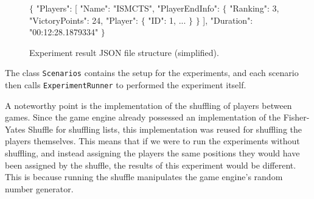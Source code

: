 \begin{figure}[ht]
\begin{code}[commandchars=\\\{\},codes={\catcode`\$=3\catcode`\^=7\catcode`\_=8}]
$\{$
    "Players": [
        "Name": "ISMCTS",
        "PlayerEndInfo": $\{$
            "Ranking": 3,
            "VictoryPoints": 24,
            "Player": $\{$
                "ID": 1,
                ...
            $\}$
        $\}$
    ],
    "Duration": "00:12:28.1879334"
$\}$
\end{code}
\caption{Experiment result JSON file structure (simplified).}\label{dd:experimentjson}
\end{figure}

The class \texttt{Scenarios} contains the setup for the experiments,
and each scenario then calls \texttt{ExperimentRunner} to performed
the experiment itself.

A noteworthy point is the implementation of the shuffling of players between games.
Since the game engine already possessed an implementation of the Fisher-Yates Shuffle
\cite{Knuth98} for shuffling lists, this implementation was reused for shuffling the
players themselves. This means that if we were to run the experiments
without shuffling, and instead assigning the players the same positions they would
have been assigned by the shuffle, the results of this experiment would be different.
This is because running the shuffle manipulates the game engine's random number generator.
